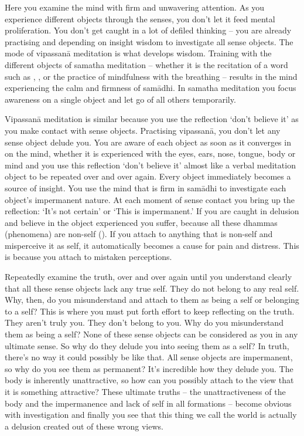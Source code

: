 Here you examine the mind with firm and unwavering attention. As you experience different objects through the senses, you don't let it feed mental proliferation. You don't get caught in a lot of defiled thinking -- you are already practising  and depending on insight wisdom to investigate all sense objects. The mode of vipassan\=a meditation is what develops wisdom. Training with the different objects of samatha meditation -- whether it is the recitation of a word such as , ,  or the practice of mindfulness with the breathing -- results in the mind experiencing the calm and firmness of sam\=adhi. In samatha meditation you focus awareness on a single object and let go of all others temporarily. 

Vipassan\=a meditation is similar because you use the reflection `don't believe it' as you make contact with sense objects. Practising vipassan\=a, you don't let any sense object delude you. You are aware of each object as soon as it converges in on the mind, whether it is experienced with the eyes, ears, nose, tongue, body or mind and you use this reflection `don't believe it' almost like a verbal meditation object to be repeated over and over again. Every object immediately becomes a source of insight. You use the mind that is firm in sam\=adhi to investigate each object's impermanent nature. At each moment of sense contact you bring up the reflection: `It's not certain' or `This is impermanent.' If you are caught in delusion and believe in the object experienced you suffer, because all these dhammas (phenomena) are non-self (). If you attach to anything that is non-self and misperceive it as self, it automatically becomes a cause for pain and distress. This is because you attach to mistaken perceptions. 

Repeatedly examine the truth, over and over again until you understand clearly that all these sense objects lack any true self. They do not belong to any real self. Why, then, do you misunderstand and attach to them as being a self or belonging to a self? This is where you must put forth effort to keep reflecting on the truth. They aren't truly you. They don't belong to you. Why do you misunderstand them as being a self? None of these sense objects can be considered as you in any ultimate sense. So why do they delude you into seeing them as a self? In truth, there's no way it could possibly be like that. All sense objects are impermanent, so why do you see them as permanent? It's incredible how they delude you. The body is inherently unattractive, so how can you possibly attach to the view that it is something attractive? These ultimate truths -- the unattractiveness of the body and the impermanence and lack of self in all formations -- become obvious with investigation and finally you see that this thing we call the world is actually a delusion created out of these wrong views.


